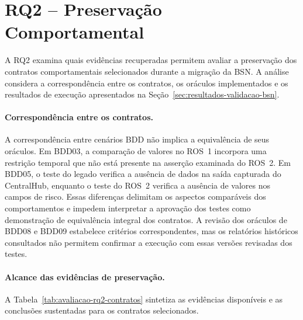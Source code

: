 \section{RQ2 -- Preservação Comportamental}
\label{sec:avaliacao-rq2}

A RQ2 examina quais evidências recuperadas permitem avaliar a preservação dos contratos comportamentais selecionados durante a migração da BSN. A análise considera a correspondência entre os contratos, os oráculos implementados e os resultados de execução apresentados na Seção~\ref{sec:resultados-validacao-bsn}.



\paragraph{Correspondência entre os contratos.}

A correspondência entre cenários BDD não implica a equivalência de seus oráculos. Em BDD03, a comparação de valores no ROS~1 incorpora uma restrição temporal que não está presente na asserção examinada do ROS~2. Em BDD05, o teste do legado verifica a ausência de dados na saída capturada do CentralHub, enquanto o teste do ROS~2 verifica a ausência de valores nos campos de risco. Essas diferenças delimitam os aspectos comparáveis dos comportamentos e impedem interpretar a aprovação dos testes como demonstração de equivalência integral dos contratos. A revisão dos oráculos de BDD08 e BDD09 estabelece critérios correspondentes, mas os relatórios históricos consultados não permitem confirmar a execução com essas versões revisadas dos testes.


\paragraph{Alcance das evidências de preservação.}

A Tabela~\ref{tab:avaliacao-rq2-contratos} sintetiza as evidências disponíveis e as conclusões sustentadas para os contratos selecionados.

